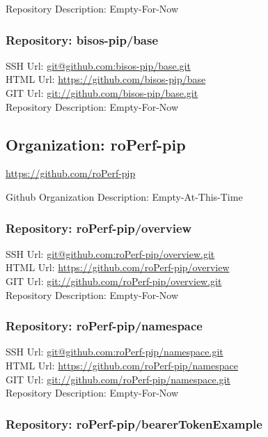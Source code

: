 Repository Description: Empty-For-Now

\subsubsection{Repository: bisos-pip/base}

SSH Url:  \url{git@github.com:bisos-pip/base.git}\\
HTML Url: \url{https://github.com/bisos-pip/base}\\
GIT Url:  \url{git://github.com/bisos-pip/base.git}\\


Repository Description: Empty-For-Now

\subsection{Organization: roPerf-pip}

\url{https://github.com/roPerf-pip}

Github Organization Description: Empty-At-This-Time

\subsubsection{Repository: roPerf-pip/overview}

SSH Url:  \url{git@github.com:roPerf-pip/overview.git}\\
HTML Url: \url{https://github.com/roPerf-pip/overview}\\
GIT Url:  \url{git://github.com/roPerf-pip/overview.git}\\


Repository Description: Empty-For-Now

\subsubsection{Repository: roPerf-pip/namespace}

SSH Url:  \url{git@github.com:roPerf-pip/namespace.git}\\
HTML Url: \url{https://github.com/roPerf-pip/namespace}\\
GIT Url:  \url{git://github.com/roPerf-pip/namespace.git}\\


Repository Description: Empty-For-Now

\subsubsection{Repository: roPerf-pip/bearerTokenExample}

